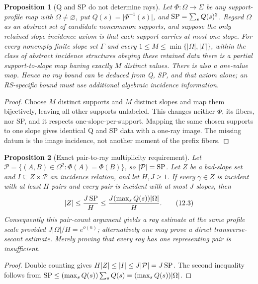 \documentclass[12pt,a4paper]{amsart}
\numberwithin{equation}{section}
\newtheorem{proposition}[proposition]{Proposition}
\theoremstyle{remark}
\newcommand{\abs}[1]{\lvert #1\rvert}
\begin{document}
\begin{proposition}[Q and SP do not determine rays]
\label{prop:q-sp-no-ray}
Let \(\Phi:\Omega\to\Sigma\) be any support-profile map with
\(\Omega\ne\varnothing\), put
\(Q(s)=\abs{\Phi^{-1}(s)}\), and
\({\rm SP}=\sum_sQ(s)^2\).  Regard \(\Omega\) as an abstract set of
candidate noncommon supports, and suppose the only retained
slope-incidence axiom is that each support carries at most one slope.  For
every nonempty finite slope set \(\Gamma\) and every
\(1\le M\le\min\{\abs\Omega,\abs\Gamma\}\), within the class of abstract
incidence structures obeying these retained data there is a partial
support-to-slope map having exactly \(M\) distinct values.  There is also
a one-value map.  Hence no ray bound can be deduced from Q, SP, and that
axiom alone; an RS-specific bound must use additional algebraic incidence
information.
\end{proposition}

\begin{proof}
Choose \(M\) distinct supports and \(M\) distinct slopes and map them
bijectively, leaving all other supports unlabeled.  This changes neither
\(\Phi\), its fibers, nor SP, and it respects one-slope-per-support.
Mapping the same chosen supports to one slope gives identical Q and SP
data with a one-ray image.  The missing datum is the image incidence, not
another moment of the prefix fibers.
\end{proof}

\begin{proposition}[Exact pair-to-ray multiplicity requirement]
\label{prop:pair-ray-multiplicity}
Let
\(\mathcal P=\{(A,B)\in\Omega^2:\Phi(A)=\Phi(B)\}\), so
\(\abs{\mathcal P}={\rm SP}\).  Let \(Z\) be a bad-slope set and
\(I\subseteq Z\times\mathcal P\) an incidence relation, and let
\(H,J\ge1\).  If every
\(\gamma\in Z\) is incident with at least \(H\) pairs and every pair is
incident with at most \(J\) slopes, then
\[
 \abs Z\le\frac{J\,{\rm SP}}H
       \le\frac{J(\max_sQ(s))\abs\Omega}{H}.
 \tag{12.3}\label{eq:pair-ray-multiplicity}
\]
Consequently this pair-count argument yields a ray estimate at the same
profile scale provided \(J\abs\Omega/H=e^{o(n)}\); alternatively one may
prove a direct transverse-secant estimate.  Merely proving that every ray
has one representing pair is insufficient.
\end{proposition}

\begin{proof}
Double counting gives
\(H\abs Z\le\abs I\le J\abs{\mathcal P}=J\,{\rm SP}\).  The second
inequality follows from
\({\rm SP}\le(\max_sQ(s))\sum_sQ(s)=(\max_sQ(s))\abs\Omega\).
\end{proof}
\end{document}
